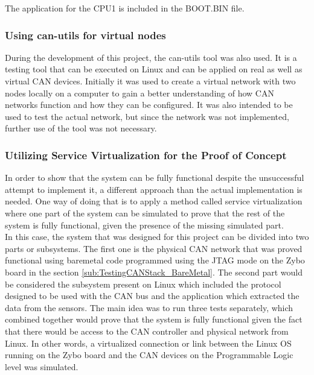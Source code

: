 The application for the CPU1 is included in the BOOT.BIN file.

\subsubsection{Using can-utils for virtual nodes}

During the development of this project, the can-utils tool was also used.
It is a testing tool that can be executed on Linux and can be applied on real as well as virtual CAN devices.
Initially it was used to create a virtual network with two nodes locally on a computer to gain a better understanding of how CAN networks function and how they can be configured.
It was also intended to be used to test the actual network, but since the network was not implemented, further use of the tool was not necessary.

\subsubsection{Utilizing Service Virtualization for the Proof of Concept}
\label{sub:Utilizing_Svr_Virtualization}

In order to show that the system can be fully functional despite the unsuccessful attempt to implement it, a different approach than the actual implementation is needed.
One way of doing that is to apply a method called service virtualization where one part of the system can be simulated to prove that the rest of the system is fully functional, given the presence of the missing simulated part.
\\
In this case, the system that was designed for this project can be divided into two parts or subsystems.
The first one is the physical CAN network that was proved functional using bare\-metal code programmed using the JTAG mode  on the Zybo board in the section \ref{sub:TestingCANStack_BareMetal}.
The second part would be considered the subsystem present on Linux which included the protocol designed to be used with the CAN bus and the application which extracted the data from the sensors.
The main idea was to run three tests separately, which combined together would prove that the system is fully functional given the fact that there would be access to the CAN controller and physical network from Linux. In other words, a virtualized connection or link between the Linux OS running on the Zybo board and the CAN devices on the Programmable Logic level  was simulated.
